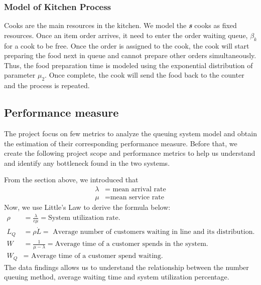 \subsubsection{Model of Kitchen Process}
Cooks are the main resources in the kitchen. We model the \textit{\textbf{s}} cooks as fixed resources.
Once an item order arrives, it need to enter the order waiting queue, $\beta_{k}$ for a cook to be free.
Once the order is assigned to the cook, the cook will start preparing the food next in queue and cannot  prepare other orders simultaneously. Thus, the food preparation time is modeled using the exponential distribution of parameter $\mu_2$.
Once complete, the cook will send the food back to the counter and the process is repeated.

\subsection{Performance measure}
The project focus on few metrics to analyze the queuing system model and obtain the estimation of their corresponding performance measure. Before that, we create the following project scope and performance metrics to help us understand and identify any bottleneck found in the two systems.

From the section above, we introduced that
\begin{align*}
    \lambda & =\text{ mean arrival rate} \\
    \mu     & = \text{mean service rate}
\end{align*}
Now, we use Little's Law to derive the formula below:
\begin{align*}
    \rho & = \frac{\lambda}{c\mu} = \text{System utilization rate}.                                  \\
    L_Q  & = \rho \dot L =\text{ Average number of customers waiting in line and its distribution.} \\
    W    & = \frac{1}{\mu - \lambda}=\text{Average time of a customer spends in the system.}        \\
    W_Q  & = \text{ Average time of a customer spend waiting.}
\end{align*}
The data findings allows us to understand the relationship between the number queuing method, average waiting time and system utilization percentage.